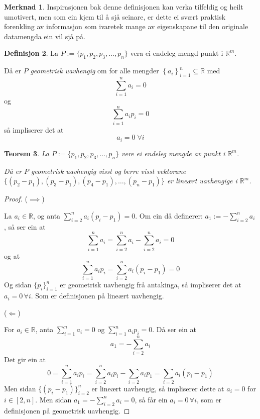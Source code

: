 \documentclass[a4paper, 12pt, norsk]{article}
\theoremstyle{plain}
\newtheorem{theorem}{Teorem}[section]
\theoremstyle{definition}
\newtheorem{definition}[theorem]{Definisjon}
\newtheorem{remark}[theorem]{Merknad}
\newcommand{\Rb}{\mathbb{R}}
\newcommand{\set}[1]{ \left\{ #1 \right\} } %
\begin{document}
\begin{remark}
	Inspirasjonen bak denne definisjonen kan verka tilfeldig og heilt umotivert, men som ein kjem til å sjå seinare, er dette ei svært praktisk forenkling av informasjon som ivaretek mange av eigenskapane til den originale datamengda ein vil sjå på.
\end{remark}

\begin{definition}
	La $ P := \{p_1, p_2, p_3, \dots, p_n\}$ vera ei endeleg mengd punkt i $\Rb^m$.

	Då er \( P \) \emph{geometrisk uavhengig} om for alle mengder \( \set{a_i}_{i=1}^n\subseteq\Rb \) med
	\[
		\sum_{i=1}^n a_i=0  
	\]
	og
	\[
		\sum_{i=1}^n a_ip_i=0
	\]
	så impliserer det at
	\[
		a_i=0 \; \forall i
	\]
\end{definition}

\begin{theorem}\label{thm:geometrisklineærtuavhengig}
	La $ P := \{p_1, p_2, p_3, \dots, p_n \}$ vere ei endeleg mengde av punkt i \( \Rb^m \).

	Då er \( P \) geometrisk uavhengig visst og berre visst vektorane $\{(p_2-p_1), (p_3-p_1), (p_4-p_1),\dots,(p_n-p_1)\}$ er lineært uavhengige i \( \Rb^m \).
\end{theorem}

\begin{proof}
	($\implies$)
		
	La $a_i\in\Rb$, og anta $\sum_{i=2}^na_i(p_i-p_1)=0$. Om ein då definerer: $a_1 := -\sum_{i=2}^na_i$, så ser ein at 
	\begin{equation*}
		\sum_{i=1}^na_i=\sum_{i=2}^na_i-\sum_{i=2}^na_i=0
	\end{equation*}
	og at 
	\begin{equation*}
		\sum_{i=1}^na_ip_i=\sum_{i=2}^na_i(p_i-p_1)=0
	\end{equation*}
	Og sidan $\{p_i\}_{i=1}^n$ er geometrisk uavhengig frå antakinga, så impliserer det at $a_i=0 \, \forall i$. Som er definisjonen på lineært uavhengig.
	
	(\(\Longleftarrow\))
	
	For $a_i\in\Rb$, anta $\sum_{i=1}^n a_i=0$ og $\sum_{i=1}^n a_ip_i=0$. Då ser ein at 
	\begin{equation*}
		a_1=-\sum_{i=2}^n a_i
	\end{equation*} 
	Det gir ein at
	\begin{equation*}
		0=\sum_{i=1}^n a_ip_i=\sum_{i=2}^n a_ip_i-\sum_{i=2}a_ip_1=\sum_{i=2}a_i(p_i-p_1)
	\end{equation*}
	Men sidan $\{(p_i-p_1)\}_{i=2}^n$ er lineært uavhengig, så impliserer dette at $ a_i = 0$ for $i\in[2,n]$. Men sidan $a_1 = -\sum_{i=2}^n a_i=0$, så får ein $a_i=0 \, \forall i$, som er definisjonen på geometrisk uavhengig.
\end{proof}
\end{document}
